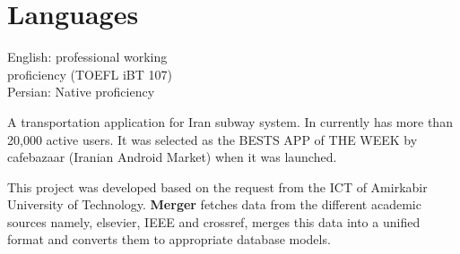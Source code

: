 \documentclass[]{deedy-resume-openfont}
\begin{document}
\begin{minipage}[t]{0.33\textwidth}

%
%
\section{Languages}
English: professional working \\proficiency (TOEFL iBT 107) \\
Persian: Native proficiency

\end{minipage}
\hfill
\begin{minipage}[t]{0.66\textwidth}

    A transportation application for Iran subway system. In currently
    has more than 20,000 active users. It was selected as the BESTS APP of THE
    WEEK by cafebazaar (Iranian Android Market) when it was launched.
\sectionsep

    This project was developed based on the request from the ICT of Amirkabir
    University of Technology. \textbf{Merger} fetches data from the different
    academic sources namely, elsevier, IEEE and crossref, merges this data
    into a unified format and converts them to appropriate database models.
\sectionsep




\end{minipage}
\end{document}
